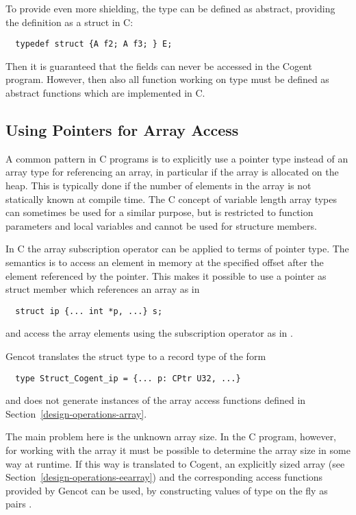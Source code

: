 To provide even more shielding, the type  can be defined as abstract, providing the definition
as a struct in C:
\begin{verbatim}
  typedef struct {A f2; A f3; } E;
\end{verbatim}
Then it is guaranteed that the fields can never be accessed in the Cogent program. However, then also 
all function working on type  must be defined as abstract functions which are implemented in C.

\subsection{Using Pointers for Array Access}
\label{app-transtype-arrpoint}

A common pattern in C programs is to explicitly use a pointer type instead of an array type for referencing an array,
in particular if the array is allocated on the heap. This is typically done if the number of elements in the
array is not statically known at compile time. The C concept of variable length array types can sometimes be
used for a similar purpose, but is restricted to function parameters and local variables and cannot be used for
structure members.

In C the array subscription operator can be applied to terms of pointer type. The semantics is to access an element 
in memory at the specified offset after the element referenced by the pointer. This makes it possible to use 
a pointer as struct member which references an array as in
\begin{verbatim}
  struct ip {... int *p, ...} s;
\end{verbatim}
and access the array elements using the subscription operator as in .

Gencot translates the struct type to a record type of the form
\begin{verbatim}
  type Struct_Cogent_ip = {... p: CPtr U32, ...}
\end{verbatim}
and does not generate instances of the array access functions defined in Section~\ref{design-operations-array}. 

The main problem here is the unknown array size. In the C program, however, for working with the array it must be
possible to determine the array size in some way at runtime. If this way is translated to Cogent, an explicitly
sized array (see Section~\ref{design-operations-eearray}) and the corresponding access functions provided by
Gencot can be used, by constructing values of type  on the fly as pairs .

